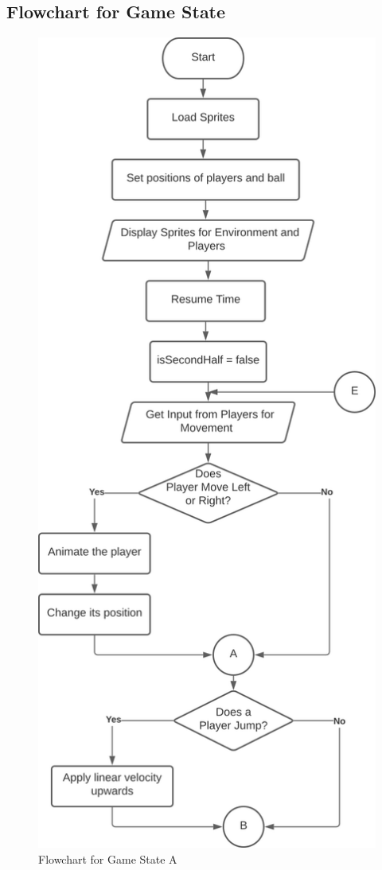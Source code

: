 \documentclass[main]{subfiles}
\begin{document}
	\subsection{Flowchart for Game State}
        \begin{figure}[H]
            \centering
            \includegraphics[scale=0.5]{graphics/flowcharts/game_state1.png}
            \caption{Flowchart for Game State A}
            \label{fig:gamestateA}
        \end{figure}	
        
\end{document}
